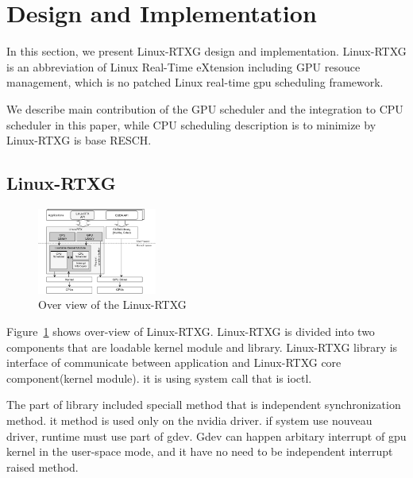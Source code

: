\section{Design and Implementation}\label{sec:design_imple}
In this section, we present Linux-RTXG design and implementation.
Linux-RTXG is an abbreviation of Linux Real-Time eXtension including GPU resouce management,
which is no patched Linux real-time gpu scheduling framework.

We describe main contribution of the GPU scheduler and the integration to CPU scheduler in this paper,
while CPU scheduling description is to minimize by Linux-RTXG is base RESCH.


\subsection{Linux-RTXG}
\begin{figure}[t]
\begin{center}
\includegraphics[width=0.35\textwidth]{img/overview.pdf}
\caption{Over view of the Linux-RTXG}
\end{center}
\label{fig:overview}
\end{figure}

Figure~\ref{fig:overview} shows over-view of Linux-RTXG.
Linux-RTXG is divided into two components that are loadable kernel module and library.
Linux-RTXG library is interface of communicate between application and Linux-RTXG core component(kernel module).
it is using system call that is ioctl.

The part of library included speciall method that is independent synchronization method.
it method is used only on the nvidia driver.
if system use nouveau driver, runtime must use part of gdev.
Gdev can happen arbitary interrupt of gpu kernel in the user-space mode, and it have no need to be independent interrupt raised method.

